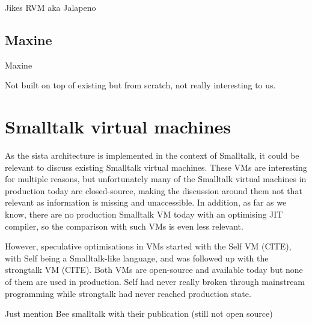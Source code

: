 \documentclass[a4paper,12pt,twoside]{../includes/ThesisStyle}
\begin{document}
Jikes RVM aka Jalapeno \cite{Alp99a}

\subsection{Maxine}

Maxine ~\cite{Wimm13a}

Not built on top of existing but from scratch, not really interesting to us.

\section{Smalltalk virtual machines}

As the sista architecture is implemented in the context of Smalltalk, it could be relevant to discuss existing Smalltalk virtual machines. These VMs are interesting for multiple reasons, but unfortunately many of the Smalltalk virtual machines in production today are closed-source, making the discussion around them not that relevant as information is missing and unaccessible. In addition, as far as we know, there are no production Smalltalk VM today with an optimising JIT compiler, so the comparison with such VMs is even less relevant. 

However, speculative optimisations in VMs started with the Self VM (CITE), with Self being a Smalltalk-like language, and was followed up with the strongtalk VM (CITE). Both VMs are open-source and available today but none of them are used in production. Self had never really broken through mainstream programming while strongtalk had never reached production state.

Just mention Bee smalltalk with their publication (still not open source)

\ifx\wholebook\relax\else
    
\end{document}
